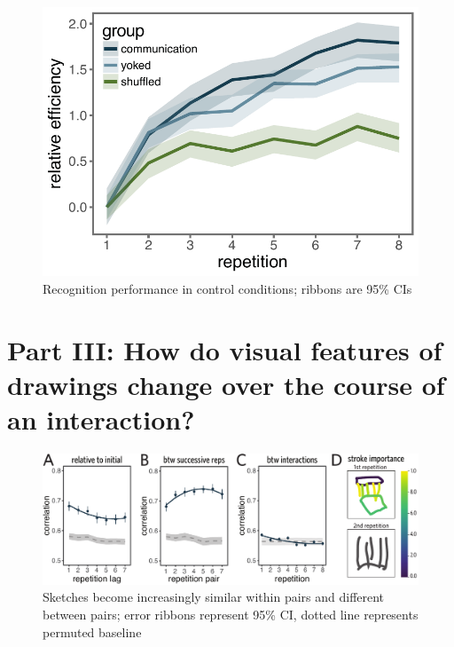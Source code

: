 \documentclass[10pt,letterpaper]{article}
\begin{document}




\begin{figure}
\includegraphics[width=\linewidth]{figures/recog_BIS_timeseries.pdf}
\caption{Recognition performance in control conditions; ribbons are 95\% CIs} 
\label{recog_bis}
\end{figure}


\section{Part III: How do visual features of drawings change over the course of an interaction?}

\begin{figure}
\includegraphics[width=0.98\linewidth]{figures/drawing_changes.pdf}
\caption{Sketches become increasingly similar within pairs and different between pairs; error ribbons represent 95\% CI, dotted line represents permuted baseline}
\label{within-across}
\end{figure}
\end{document}
